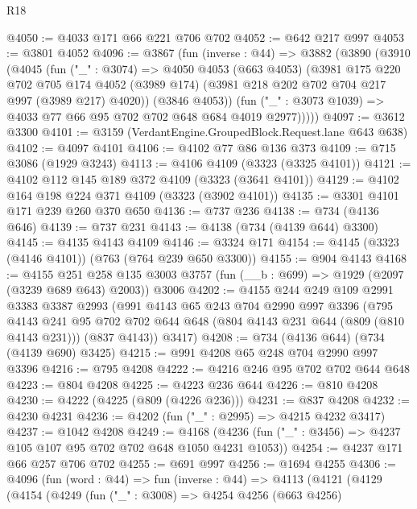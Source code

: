 \begin{lexlean}{R18}
\begin{coremodule}
@4050 := @4033 @171 @66 @221 @706 @702
@4052 := @642 @217 @997
@4053 := @3801 @4052
@4096 := @3867
    (fun (inverse : @44) =>
    @3882
      (@3890
        (@3910
          (@4045
            (fun ("_" : @3074) =>
            @4050
              @4053
              (@663 @4053)
              (@3981
                @175
                @220
                @702
                @705
                @174
                @4052
                (@3989 @174)
                (@3981 @218 @202 @702 @704 @217 @997 (@3989 @217) @4020))
              (@3846 @4053))
            (fun ("_" : @3073 @1039) => @4033 @77 @66 @95 @702 @702 @648 @684 @4019 @2977)))))
@4097 := @3612 @3300
@4101 := @3159 (VerdantEngine.GroupedBlock.Request.lane @643 @638)
@4102 := @4097 @4101
@4106 := @4102 @77 @86 @136 @373
@4109 := @715 @3086 (@1929 @3243)
@4113 := @4106 @4109 (@3323 (@3325 @4101))
@4121 := @4102 @112 @145 @189 @372 @4109 (@3323 (@3641 @4101))
@4129 := @4102 @164 @198 @224 @371 @4109 (@3323 (@3902 @4101))
@4135 := @3301 @4101 @171 @239 @260 @370 @650
@4136 := @737 @236
@4138 := @734 (@4136 @646)
@4139 := @737 @231
@4143 := @4138 (@734 (@4139 @644) @3300)
@4145 := @4135 @4143 @4109
@4146 := @3324 @171
@4154 := @4145 (@3323 (@4146 @4101)) (@763 (@764 @239 @650 @3300))
@4155 := @904 @4143
@4168 := @4155
    @251
    @258
    @135
    @3003
    @3757
    (fun (__b : @699) => @1929 (@2097 (@3239 @689 @643) @2003))
    @3006
@4202 := @4155
    @244
    @249
    @109
    @2991
    @3383
    @3387
    @2993
    (@991
      @4143
      @65
      @243
      @704
      @2990
      @997
      @3396
      (@795
        @4143
        @241
        @95
        @702
        @702
        @644
        @648
        (@804 @4143 @231 @644 (@809 (@810 @4143 @231)))
        (@837 @4143))
      @3417)
@4208 := @734 (@4136 @644) (@734 (@4139 @690) @3425)
@4215 := @991 @4208 @65 @248 @704 @2990 @997 @3396
@4216 := @795 @4208
@4222 := @4216 @246 @95 @702 @702 @644 @648
@4223 := @804 @4208
@4225 := @4223 @236 @644
@4226 := @810 @4208
@4230 := @4222 (@4225 (@809 (@4226 @236)))
@4231 := @837 @4208
@4232 := @4230 @4231
@4236 := @4202 (fun ("_" : @2995) => @4215 @4232 @3417)
@4237 := @1042 @4208
@4249 := @4168 (@4236 (fun ("_" : @3456) => @4237 @105 @107 @95 @702 @702 @648 @1050 @4231 @1053))
@4254 := @4237 @171 @66 @257 @706 @702
@4255 := @691 @997
@4256 := @1694 @4255
@4306 := @4096
    (fun (word : @44) =>
    fun (inverse : @44) =>
    @4113
      (@4121
        (@4129
          (@4154
            (@4249
              (fun ("_" : @3008) =>
              @4254
                @4256
                (@663 @4256)

\end{coremodule}
\end{lexlean}
